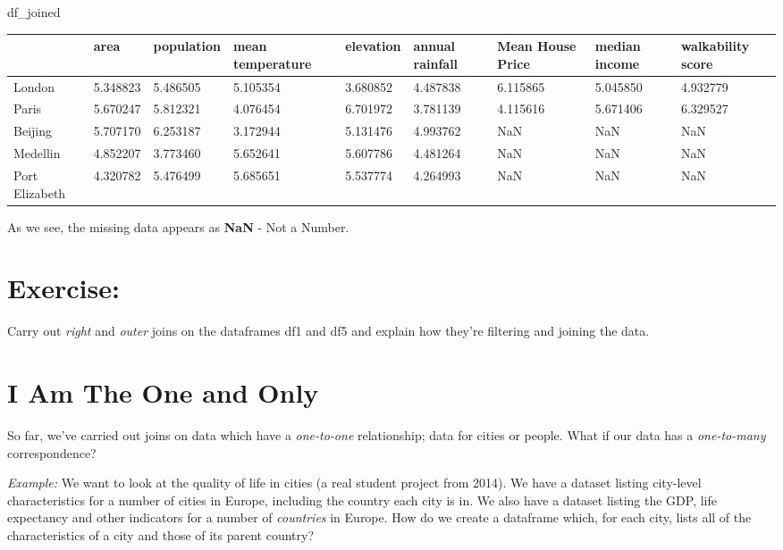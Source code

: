 \documentclass[
  letterpaper,
  DIV=11,
  numbers=noendperiod]{scrreprt}
\newenvironment{Shaded}{\begin{snugshade}}{\end{snugshade}}
\newcommand{\NormalTok}[1]{\textcolor[rgb]{0.00,0.23,0.31}{#1}}
\begin{document}
\begin{Shaded}
\begin{Highlighting}[]
\NormalTok{df\_joined}
\end{Highlighting}
\end{Shaded}

\begin{longtable}[]{@{}lllllllll@{}}
\toprule()
& area & population & mean temperature & elevation & annual rainfall &
Mean House Price & median income & walkability score \\
\midrule()
\endhead
London & 5.348823 & 5.486505 & 5.105354 & 3.680852 & 4.487838 & 6.115865
& 5.045850 & 4.932779 \\
Paris & 5.670247 & 5.812321 & 4.076454 & 6.701972 & 3.781139 & 4.115616
& 5.671406 & 6.329527 \\
Beijing & 5.707170 & 6.253187 & 3.172944 & 5.131476 & 4.993762 & NaN &
NaN & NaN \\
Medellin & 4.852207 & 3.773460 & 5.652641 & 5.607786 & 4.481264 & NaN &
NaN & NaN \\
Port Elizabeth & 4.320782 & 5.476499 & 5.685651 & 5.537774 & 4.264993 &
NaN & NaN & NaN \\
\bottomrule()
\end{longtable}

As we see, the missing data appears as \textbf{NaN} - Not a Number.

\hypertarget{exercise-14}{%
\section{Exercise:}\label{exercise-14}}

Carry out \emph{right} and \emph{outer} joins on the dataframes df1 and
df5 and explain how they're filtering and joining the data.

\hypertarget{i-am-the-one-and-only}{%
\section{I Am The One and Only}\label{i-am-the-one-and-only}}

So far, we've carried out joins on data which have a \emph{one-to-one}
relationship; data for cities or people. What if our data has a
\emph{one-to-many} correspondence?

\emph{Example:} We want to look at the quality of life in cities (a real
student project from 2014). We have a dataset listing city-level
characteristics for a number of cities in Europe, including the country
each city is in. We also have a dataset listing the GDP, life expectancy
and other indicators for a number of \emph{countries} in Europe. How do
we create a dataframe which, for each city, lists all of the
characteristics of a city and those of its parent country?
\end{document}
